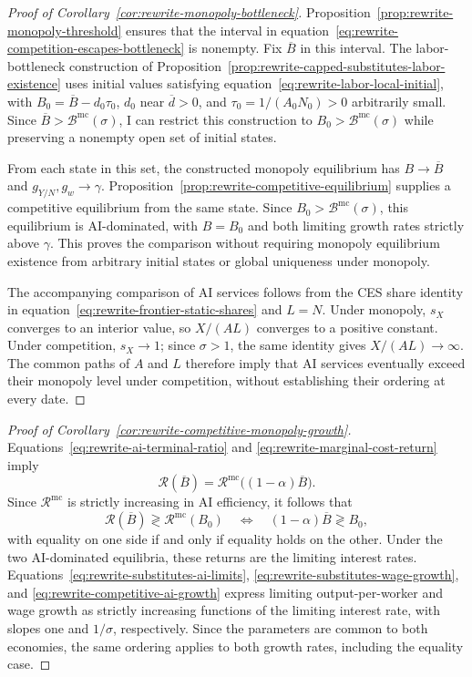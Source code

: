 \begin{proof}[Proof of Corollary~\ref{cor:rewrite-monopoly-bottleneck}]
\label{proof:rewrite-monopoly-bottleneck}
Proposition~\ref{prop:rewrite-monopoly-threshold} ensures that the
interval in equation~\eqref{eq:rewrite-competition-escapes-bottleneck}
is nonempty. Fix $\overline B$ in this interval. The labor-bottleneck
construction of Proposition~\ref{prop:rewrite-capped-substitutes-labor-existence}
uses initial values satisfying
equation~\eqref{eq:rewrite-labor-local-initial}, with
$B_0=\overline B-d_0\tau_0$, $d_0$ near $\overline d>0$, and
$\tau_0=1/(A_0N_0)>0$ arbitrarily small.
Since $\overline B>\mathcal B^{\mathrm{mc}}(\sigma)$, I can restrict this
construction to $B_0>\mathcal B^{\mathrm{mc}}(\sigma)$ while preserving
a nonempty open set of initial states.

From each state in this set, the constructed monopoly equilibrium has
$B\to\overline B$ and $g_{Y/N},g_w\to\gamma$.
Proposition~\ref{prop:rewrite-competitive-equilibrium} supplies a
competitive equilibrium from the same state. Since
$B_0>\mathcal B^{\mathrm{mc}}(\sigma)$, this equilibrium is AI-dominated,
with $B=B_0$ and both limiting growth rates strictly above $\gamma$.
This proves the comparison without requiring monopoly equilibrium
existence from arbitrary initial states or global uniqueness under monopoly.

The accompanying comparison of AI services follows from the CES share
identity in equation~\eqref{eq:rewrite-frontier-static-shares} and $L=N$.
Under monopoly, $s_X$ converges to an interior value, so $X/(AL)$
converges to a positive constant. Under competition, $s_X\to1$;
since $\sigma>1$, the same identity gives $X/(AL)\to\infty$.
The common paths of $A$ and $L$ therefore imply that AI services
eventually exceed their monopoly level under competition, without
establishing their ordering at every date.
\end{proof}

\begin{proof}[Proof of Corollary~\ref{cor:rewrite-competitive-monopoly-growth}]
\label{proof:rewrite-competitive-monopoly-growth}
Equations~\eqref{eq:rewrite-ai-terminal-ratio} and
\eqref{eq:rewrite-marginal-cost-return} imply
\[
 \mathcal R(\overline B)
 =\mathcal R^{\mathrm{mc}}\bigl((1-\alpha)\overline B\bigr).
\]
Since $\mathcal R^{\mathrm{mc}}$ is strictly increasing in AI efficiency,
it follows that
\[
 \mathcal R(\overline B)\gtrless\mathcal R^{\mathrm{mc}}(B_0)
 \quad\Longleftrightarrow\quad
 (1-\alpha)\overline B\gtrless B_0,
\]
with equality on one side if and only if equality holds on the other.
Under the two AI-dominated equilibria, these returns are the limiting
interest rates. Equations~\eqref{eq:rewrite-substitutes-ai-limits},
\eqref{eq:rewrite-substitutes-wage-growth}, and
\eqref{eq:rewrite-competitive-ai-growth} express limiting
output-per-worker and wage growth as strictly increasing functions of
the limiting interest rate, with slopes one and $1/\sigma$, respectively.
Since the parameters are common to both economies, the same ordering
applies to both growth rates, including the equality case.
\end{proof}

